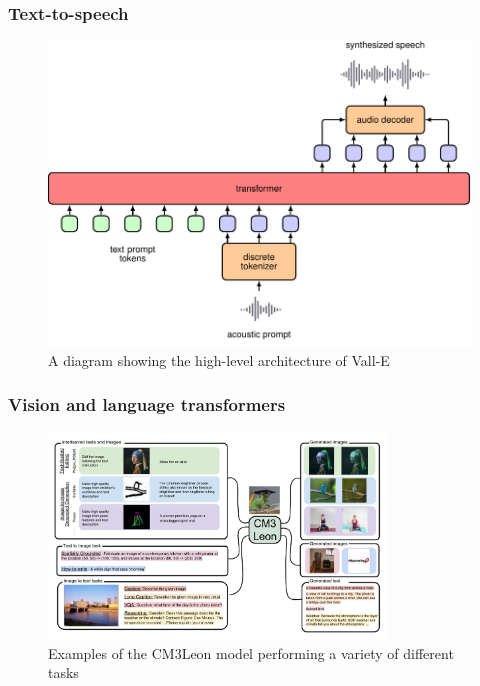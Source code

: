 \documentclass{beamer}
\begin{document}
\begin{frame}
    \frametitle{Text-to-speech}
    \begin{figure}
        \caption{A diagram showing the high-level architecture of Vall-E}
        \includegraphics[height=0.7\textheight]{Figure_26.pdf}
    \end{figure}
\end{frame}

\begin{frame}
    \frametitle{Vision and language transformers}
    \begin{figure}
        \caption{Examples of the CM3Leon model performing a variety of different tasks}
        \includegraphics[width=0.8\textwidth]{Figure_27.png}
    \end{figure}
\end{frame}
\end{document}
